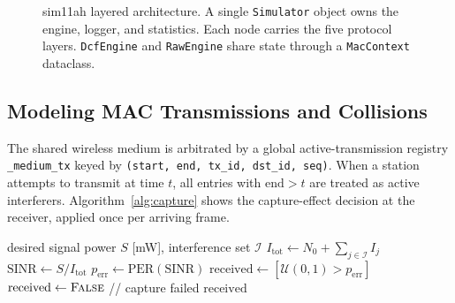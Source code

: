 \documentclass[conference]{IEEEtran}
\begin{document}
\begin{figure}[!t]
\caption{sim11ah layered architecture. A single \texttt{Simulator} object
  owns the engine, logger, and statistics. Each node carries the five
  protocol layers. \texttt{DcfEngine} and \texttt{RawEngine} share state
  through a \texttt{MacContext} dataclass.}
\label{fig:arch}
\end{figure}

\subsection{Modeling MAC Transmissions and Collisions}

The shared wireless medium is arbitrated by a global active-transmission
registry \texttt{\_medium\_tx} keyed by \texttt{(start, end, tx\_id,
dst\_id, seq)}.
When a station attempts to transmit at time $t$, all entries with
$\mathrm{end} > t$ are treated as active interferers.
Algorithm~\ref{alg:capture} shows the capture-effect decision at the
receiver, applied once per arriving frame.

\begin{algorithm}[!t]
\caption{Frame reception with capture effect}
\label{alg:capture}
\begin{algorithmic}[1]
\Require desired signal power $S$ [mW], interference set $\mathcal{I}$
\State $I_\mathrm{tot} \leftarrow N_0 + \sum_{j \in \mathcal{I}} I_j$
\State $\mathrm{SINR} \leftarrow S / I_\mathrm{tot}$
  \State $p_\mathrm{err} \leftarrow \mathrm{PER}(\mathrm{SINR})$
  \State $\mathrm{received} \leftarrow [\mathcal{U}(0,1) > p_\mathrm{err}]$
\Else
  \State $\mathrm{received} \leftarrow \textsc{False}$ \quad // capture failed
\EndIf
\State \Return $\mathrm{received}$
\end{algorithmic}
\end{algorithm}
\end{document}
